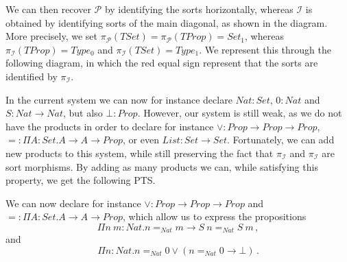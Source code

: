 \documentclass[]{template}
\begin{document}
We can then recover $ \mathcal{P} $ by identifying the sorts horizontally, whereas $ \mathcal{I} $ is obtained by identifying sorts of the main diagonal, as shown in the diagram. More precisely, we set $ \pi_\mathcal{P}(TSet) = \pi_\mathcal{P}(TProp)=Set_1 $, whereas $ \pi_\mathcal{I}(TProp) =  Type_0$ and $\pi_\mathcal{I}(TSet)=Type_1 $. We represent this through the following diagram, in which the red equal sign represent that the sorts are identified by $ \pi_\mathcal{I} $.

\begin{center}
\end{center}

In the current system we can now for instance declare $ Nat : Set $, $ 0 : Nat $ and $ S : Nat \to Nat $, but also $ \bot : Prop $. However, our system is still weak, as we do not have the products in order to declare for instance $ \lor  : Prop \to Prop \to Prop  $, $ = : \Pi A : Set. A \to A \to Prop $, or even $ List : Set \to Set $. Fortunately, we can add new products to this system, while still preserving the fact that $ \pi_\mathcal{I} $ and $ \pi_\mathcal{I} $ are sort morphisms. By adding as many products we can, while satisfying this property, we get the following PTS.

\begin{center}
\end{center}
We can now declare for instance $ \lor  : Prop \to Prop \to Prop  $ and $ = : \Pi A : Set. A \to A \to Prop $, which allow us to express the propositions \[
\Pi n~m : Nat. n =_{Nat} m \to S~n =_{Nat} S~m
  \,,\] and \[
  \Pi n : Nat. n =_{Nat} 0 \lor (n =_{Nat} 0 \to \bot) 
  \,.\]
\end{document}
